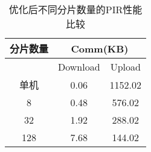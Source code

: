 \begin{table}[]
    \caption{优化后不同分片数量的PIR性能比较}
    \label{tab:sharded-scheme-optimized}
    \centering
    \begin{tabular}{@{}c|cc@{}}
    \toprule
    分片数量 & \multicolumn{2}{c}{Comm(KB)} \\ \midrule
         & Download      & Upload       \\ \midrule
    单机   & 0.06          & 1152.02      \\
    8    & 0.48          & 576.02       \\
    32   & 1.92          & 288.02       \\
    128  & 7.68          & 144.02       \\ \bottomrule
    \end{tabular}
\end{table}

